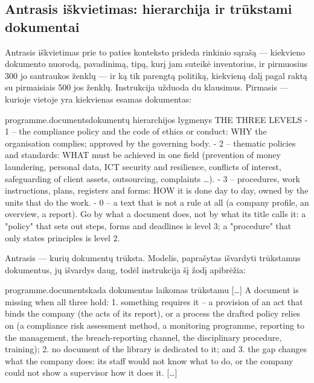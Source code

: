 \subsection{Antrasis iškvietimas: hierarchija ir trūkstami dokumentai}

Antrasis iškvietimas prie to paties konteksto prideda rinkinio sąrašą --- kiekvieno dokumento
nuorodą, pavadinimą, tipą, kurį jam suteikė inventorius, ir pirmuosius 300 jo santraukos
ženklų --- ir ką tik parengtą politiką, kiekvieną dalį pagal raktą su pirmaisiais 500 jos
ženklų. Instrukcija  užduoda du klausimus. Pirmasis --- kurioje
vietoje yra kiekvienas esamas dokumentas:

\begin{promptexcerpt}{programme.documents}{dokumentų hierarchijos lygmenys}
THE THREE LEVELS
- 1 – the compliance policy and the code of ethics or conduct: WHY the organisation complies; approved by the governing body.
- 2 – thematic policies and standards: WHAT must be achieved in one field (prevention of money laundering, personal data, ICT security and resilience, conflicts of interest, safeguarding of client assets, outsourcing, complaints …).
- 3 – procedures, work instructions, plans, registers and forms: HOW it is done day to day, owned by the units that do the work.
- 0 – a text that is not a rule at all (a company profile, an overview, a report).
Go by what a document does, not by what its title calls it: a "policy" that sets out steps, forms and deadlines is level 3; a "procedure" that only states principles is level 2.
\end{promptexcerpt}

Antrasis --- kurių dokumentų trūksta. Modelis, paprašytas išvardyti trūkstamus dokumentus,
jų išvardys daug, todėl instrukcija šį žodį apibrėžia:

\begin{promptexcerpt}{programme.documents}{kada dokumentas laikomas trūkstamu}
[…]
A document is missing when all three hold:
1. something requires it – a provision of an act that binds the company (the acts of its report), or a process the drafted policy relies on (a compliance risk assessment method, a monitoring programme, reporting to the management, the breach-reporting channel, the disciplinary procedure, training);
2. no document of the library is dedicated to it; and
3. the gap changes what the company does: its staff would not know what to do, or the company could not show a supervisor how it does it.
[…]
\end{promptexcerpt}

